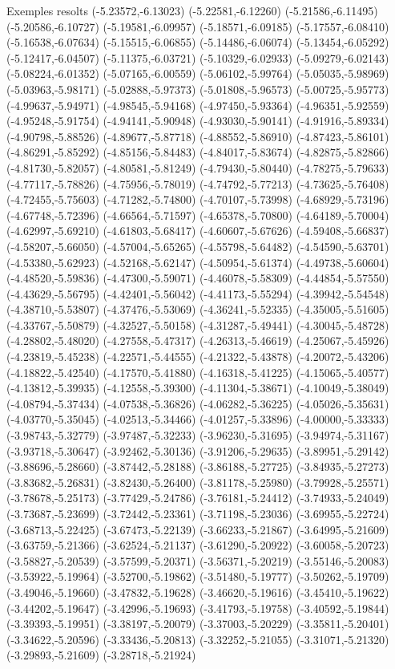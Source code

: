 \documentclass[11pt,a4paper]{article}
\begin{document}
\begin{fmex}{Exemples resolts}
(-5.23572,-6.13023) (-5.22581,-6.12260) (-5.21586,-6.11495) (-5.20586,-6.10727) (-5.19581,-6.09957) (-5.18571,-6.09185) (-5.17557,-6.08410) (-5.16538,-6.07634) (-5.15515,-6.06855) (-5.14486,-6.06074) (-5.13454,-6.05292) (-5.12417,-6.04507) (-5.11375,-6.03721) (-5.10329,-6.02933) (-5.09279,-6.02143) (-5.08224,-6.01352) (-5.07165,-6.00559) (-5.06102,-5.99764) (-5.05035,-5.98969) (-5.03963,-5.98171) (-5.02888,-5.97373) (-5.01808,-5.96573) (-5.00725,-5.95773) (-4.99637,-5.94971) (-4.98545,-5.94168) (-4.97450,-5.93364) (-4.96351,-5.92559) (-4.95248,-5.91754) (-4.94141,-5.90948) (-4.93030,-5.90141) (-4.91916,-5.89334) (-4.90798,-5.88526) (-4.89677,-5.87718) (-4.88552,-5.86910) (-4.87423,-5.86101) (-4.86291,-5.85292) (-4.85156,-5.84483) (-4.84017,-5.83674) (-4.82875,-5.82866) (-4.81730,-5.82057) (-4.80581,-5.81249) (-4.79430,-5.80440) (-4.78275,-5.79633) (-4.77117,-5.78826) (-4.75956,-5.78019) (-4.74792,-5.77213) (-4.73625,-5.76408) (-4.72455,-5.75603) (-4.71282,-5.74800) (-4.70107,-5.73998) (-4.68929,-5.73196) (-4.67748,-5.72396) (-4.66564,-5.71597) (-4.65378,-5.70800) (-4.64189,-5.70004) (-4.62997,-5.69210) (-4.61803,-5.68417) (-4.60607,-5.67626) (-4.59408,-5.66837) (-4.58207,-5.66050) (-4.57004,-5.65265) (-4.55798,-5.64482) (-4.54590,-5.63701) (-4.53380,-5.62923) (-4.52168,-5.62147) (-4.50954,-5.61374) (-4.49738,-5.60604) (-4.48520,-5.59836) (-4.47300,-5.59071) (-4.46078,-5.58309) (-4.44854,-5.57550) (-4.43629,-5.56795) (-4.42401,-5.56042) (-4.41173,-5.55294) (-4.39942,-5.54548) (-4.38710,-5.53807) (-4.37476,-5.53069) (-4.36241,-5.52335) (-4.35005,-5.51605) (-4.33767,-5.50879) (-4.32527,-5.50158) (-4.31287,-5.49441) (-4.30045,-5.48728) (-4.28802,-5.48020) (-4.27558,-5.47317) (-4.26313,-5.46619) (-4.25067,-5.45926) (-4.23819,-5.45238) (-4.22571,-5.44555) (-4.21322,-5.43878) (-4.20072,-5.43206) (-4.18822,-5.42540) (-4.17570,-5.41880) (-4.16318,-5.41225) (-4.15065,-5.40577) (-4.13812,-5.39935) (-4.12558,-5.39300) (-4.11304,-5.38671) (-4.10049,-5.38049) (-4.08794,-5.37434) (-4.07538,-5.36826) (-4.06282,-5.36225) (-4.05026,-5.35631) (-4.03770,-5.35045) (-4.02513,-5.34466) (-4.01257,-5.33896) (-4.00000,-5.33333) (-3.98743,-5.32779) (-3.97487,-5.32233) (-3.96230,-5.31695) (-3.94974,-5.31167) (-3.93718,-5.30647) (-3.92462,-5.30136) (-3.91206,-5.29635) (-3.89951,-5.29142) (-3.88696,-5.28660) (-3.87442,-5.28188) (-3.86188,-5.27725) (-3.84935,-5.27273) (-3.83682,-5.26831) (-3.82430,-5.26400) (-3.81178,-5.25980) (-3.79928,-5.25571) (-3.78678,-5.25173) (-3.77429,-5.24786) (-3.76181,-5.24412) (-3.74933,-5.24049) (-3.73687,-5.23699) (-3.72442,-5.23361) (-3.71198,-5.23036) (-3.69955,-5.22724) (-3.68713,-5.22425) (-3.67473,-5.22139) (-3.66233,-5.21867) (-3.64995,-5.21609) (-3.63759,-5.21366) (-3.62524,-5.21137) (-3.61290,-5.20922) (-3.60058,-5.20723) (-3.58827,-5.20539) (-3.57599,-5.20371) (-3.56371,-5.20219) (-3.55146,-5.20083) (-3.53922,-5.19964) (-3.52700,-5.19862) (-3.51480,-5.19777) (-3.50262,-5.19709) (-3.49046,-5.19660) (-3.47832,-5.19628) (-3.46620,-5.19616) (-3.45410,-5.19622) (-3.44202,-5.19647) (-3.42996,-5.19693) (-3.41793,-5.19758) (-3.40592,-5.19844) (-3.39393,-5.19951) (-3.38197,-5.20079) (-3.37003,-5.20229) (-3.35811,-5.20401) (-3.34622,-5.20596) (-3.33436,-5.20813) (-3.32252,-5.21055) (-3.31071,-5.21320) (-3.29893,-5.21609) (-3.28718,-5.21924) 
\end{fmex}
\end{document}
